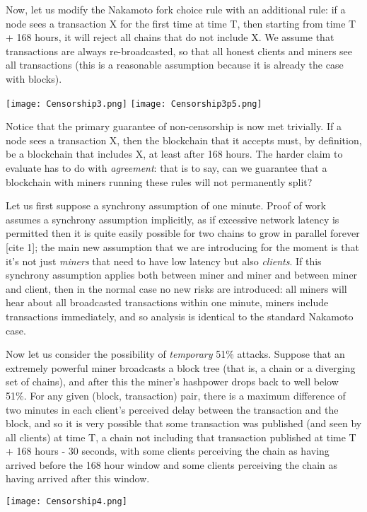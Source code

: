\documentclass[12pt]{article}
\begin{document}
Now, let us modify the Nakamoto fork choice rule with an additional rule: if a node sees a transaction X for the first time at time T, then starting from time T + 168 hours, it will reject all chains that do not include X. We assume that transactions are always re-broadcasted, so that all honest clients and miners see all transactions (this is a reasonable assumption because it is already the case with blocks).

\texttt{[image: Censorship3.png]}
\texttt{[image: Censorship3p5.png]}

Notice that the primary guarantee of non-censorship is now met trivially. If a node sees a transaction X, then the blockchain that it accepts must, by definition, be a blockchain that includes X, at least after 168 hours. The harder claim to evaluate has to do with \textit{agreement}: that is to say, can we guarantee that a blockchain with miners running these rules will not permanently split?

Let us first suppose a synchrony assumption of one minute. Proof of work assumes a synchrony assumption implicitly, as if excessive network latency is permitted then it is quite easily possible for two chains to grow in parallel forever [cite 1]; the main new assumption that we are introducing for the moment is that it's not just \textit{miners} that need to have low latency but also \textit{clients}. If this synchrony assumption applies both between miner and miner and between miner and client, then in the normal case no new risks are introduced: all miners will hear about all broadcasted transactions within one minute, miners include transactions immediately, and so analysis is identical to the standard Nakamoto case.

Now let us consider the possibility of \textit{temporary} 51\% attacks. Suppose that an extremely powerful miner broadcasts a block tree (that is, a chain or a diverging set of chains), and after this the miner's hashpower drops back to well below 51\%. For any given (block, transaction) pair, there is a maximum difference of two minutes in each client's perceived delay between the transaction and the block, and so it is very possible that some transaction was published (and seen by all clients) at time T, a chain not including that transaction published at time T + 168 hours - 30 seconds, with some clients perceiving the chain as having arrived before the 168 hour window and some clients perceiving the chain as having arrived after this window.

\texttt{[image: Censorship4.png]}
\end{document}
